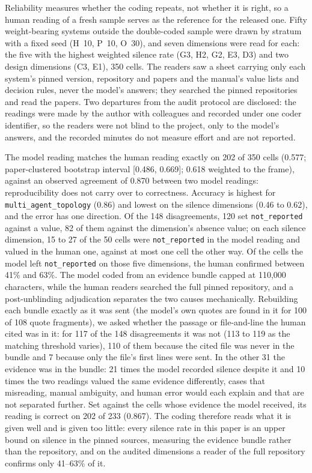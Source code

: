 Reliability measures whether the coding repeats, not whether it is right, so a human reading of a fresh
sample serves as the reference for the released one. Fifty weight-bearing systems outside the
double-coded sample were drawn by stratum with a fixed seed (H~10, P~10, O~30), and seven dimensions
were read for each: the five with the highest weighted silence rate (G3, H2, G2, E3, D3) and two design
dimensions (C3, E1), 350 cells. The readers saw a sheet carrying only each system's pinned version,
repository and papers and the manual's value lists and decision rules, never the model's answers; they
searched the pinned repositories and read the papers. Two departures from the audit protocol are disclosed:
the readings were made by the author with colleagues and recorded under one coder identifier, so the
readers were not blind to the project, only to the model's answers, and the recorded minutes do not
measure effort and are not reported.



The model reading matches the human reading exactly on 202 of 350 cells (0.577; paper-clustered
bootstrap interval [0.486, 0.669]; 0.618 weighted to the frame), against an observed agreement of 0.870
between two model readings: reproducibility does not carry over to correctness. Accuracy is highest for
\texttt{multi\_agent\_topology} (0.86) and lowest on the silence dimensions (0.46 to 0.62), and the error
has one direction. Of the 148 disagreements, 120 set \texttt{not\_reported} against a value, 82 of them
against the dimension's absence value; on each silence dimension, 15 to 27 of the 50 cells were
\texttt{not\_reported} in the model reading and valued in the human one, against at most one cell the other way. Of the cells the model left
\texttt{not\_reported} on those five dimensions, the human confirmed between 41\% and 63\%. The model coded
from an evidence bundle capped at 110,000 characters, while the human readers searched the full pinned
repository, and a post-unblinding adjudication separates the two causes mechanically. Rebuilding each
bundle exactly as it was sent (the model's own quotes are found in it for 100 of 108 quote fragments), we
asked whether the passage or file-and-line the human cited was in it: for 117 of the 148 disagreements it
was not (113 to 119 as the matching threshold varies), 110 of them because the cited file was never in
the bundle and 7 because only the file's first lines were sent. In the other 31 the evidence was in the
bundle: 21 times the model recorded silence despite it and 10 times the two readings valued the same
evidence differently, cases that misreading, manual ambiguity, and human error would each explain and that
are not separated further. Set against the cells whose evidence the model received, its reading is correct
on 202 of 233 (0.867). The coding therefore reads what it is given well and is given too little: every
silence rate in this paper is an upper bound on silence in the pinned sources, measuring the evidence
bundle rather than the repository, and on the audited dimensions a reader of the full repository
confirms only 41--63\% of it.

